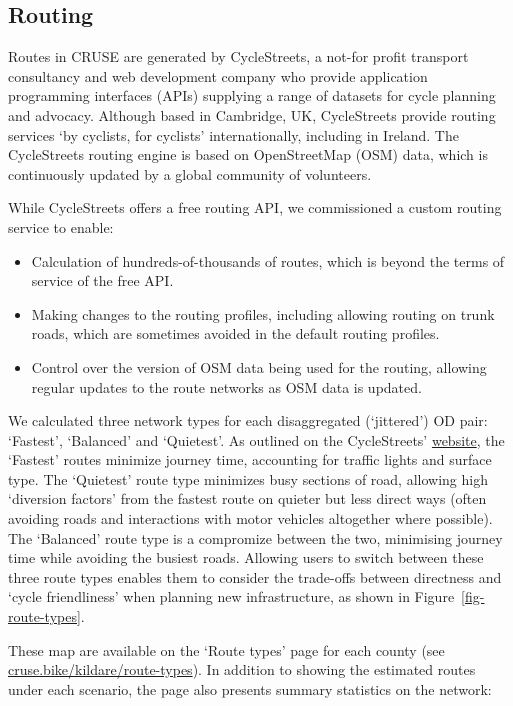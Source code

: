 \documentclass[
  super,
  preprint,
  3p]{elsarticle}
\providecommand{\tightlist}{%
  \setlength{\itemsep}{0pt}\setlength{\parskip}{0pt}}\usepackage{longtable,booktabs,array}
\begin{document}
\subsection{Routing}\label{routing}

Routes in CRUSE are generated by CycleStreets, a not-for profit
transport consultancy and web development company who provide
application programming interfaces (APIs) supplying a range of datasets
for cycle planning and advocacy. Although based in Cambridge, UK,
CycleStreets provide routing services `by cyclists, for cyclists'
internationally, including in Ireland. The CycleStreets routing engine
is based on OpenStreetMap (OSM) data, which is continuously updated by a
global community of volunteers.

While CycleStreets offers a free routing API, we commissioned a custom
routing service to enable:

\begin{itemize}
\tightlist
\item
  Calculation of hundreds-of-thousands of routes, which is beyond the
  terms of service of the free API.
\item
  Making changes to the routing profiles, including allowing routing on
  trunk roads, which are sometimes avoided in the default routing
  profiles.
\item
  Control over the version of OSM data being used for the routing,
  allowing regular updates to the route networks as OSM data is updated.
\end{itemize}

We calculated three network types for each disaggregated (`jittered') OD
pair: `Fastest', `Balanced' and `Quietest'. As outlined on the
CycleStreets'
\href{https://www.cyclestreets.net/help/journey/howitworks/}{website},
the `Fastest' routes minimize journey time, accounting for traffic
lights and surface type. The `Quietest' route type minimizes busy
sections of road, allowing high `diversion factors' from the fastest
route on quieter but less direct ways (often avoiding roads and
interactions with motor vehicles altogether where possible). The
`Balanced' route type is a compromize between the two, minimising
journey time while avoiding the busiest roads. Allowing users to switch
between these three route types enables them to consider the trade-offs
between directness and `cycle friendliness' when planning new
infrastructure, as shown in Figure~\ref{fig-route-types}.

These map are available on the `Route types' page for each county (see
\href{https://cruse.bike/kildare/route-types}{cruse.bike/kildare/route-types}).
In addition to showing the estimated routes under each scenario, the
page also presents summary statistics on the network:
\end{document}
